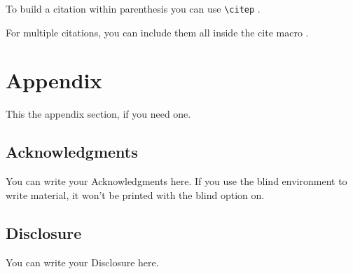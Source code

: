 \documentclass{EQDclass}
\begin{document}
To build a citation within parenthesis you can use \verb+\citep+ \citep{latexcompanion}.

For multiple citations, you can include them all inside the cite macro \citep{latexcompanion,einstein}.


\printendnotes

\appendix
\section{Appendix}

This the appendix section, if you need one.


\nocite{knuthwebsite}%
\printbibliography

\begin{blind}
\section{Acknowledgments}

You can write your Acknowledgments here.
If you use the blind environment to write material, it won't be printed with the blind option on.
\end{blind}

\begin{blind}
\section{Disclosure}

You can write your Disclosure here.
\end{blind}
\end{document}
